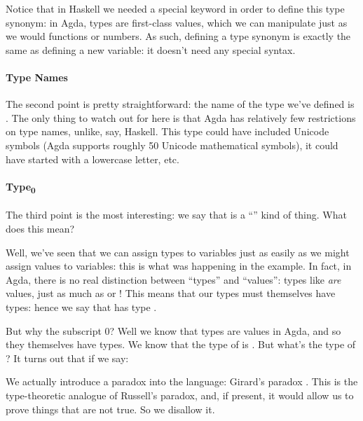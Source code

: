 Notice that in Haskell we needed a special keyword in order to define this type
synonym: in Agda, types are first-class values, which we can manipulate just as
we would functions or numbers.
As such, defining a type synonym is exactly the same as defining a new variable:
it doesn't need any special syntax.
\paragraph{Type Names}
The second point is pretty straightforward: the name of the type we've defined
is .
The only thing to watch out for here is that Agda has relatively few
restrictions on type names, unlike, say, Haskell.
This type could have included Unicode symbols (Agda supports roughly 50 Unicode
mathematical symbols), it could have started with a lowercase letter, etc.

\paragraph{Type\textsubscript{0}}
The third point is the most interesting: we say that  is a
``'' kind of thing.
What does this mean?

Well, we've seen that we can assign types to variables just as easily as we
might assign values to variables: this is what was happening in the
 example.
In fact, in Agda, there is no real distinction between ``types'' and ``values'':
types like  \emph{are} values, just as much as
 or !
This means that our types must themselves have types: hence we say that
 has type .

But why the subscript 0?
Well we know that types are values in Agda, and so they themselves have types.
We know that the type of  is
.
But what's the type of ?
It turns out that if we say:
We actually introduce a paradox into the language: Girard's paradox
\citep{girardInterpretationFonctionelleElimination1972}.
This is the type-theoretic analogue of Russell's paradox, and, if present, it
would allow us to prove things that are not true.
So we disallow it.

